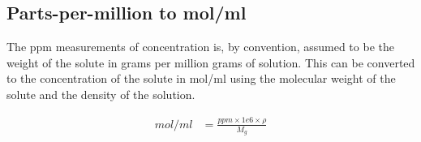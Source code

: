 \subsection{Parts-per-million to mol/ml}

The ppm measurements of concentration is, by convention, assumed to be the
weight of the solute in grams per million grams of solution. This can be
converted to the concentration of the solute in mol/ml using the molecular
weight of the solute and the density of the solution.

\begin{align}
    mol/ml &= \frac{ppm \times 1e6 \times \rho}{M_g}
\end{align}
